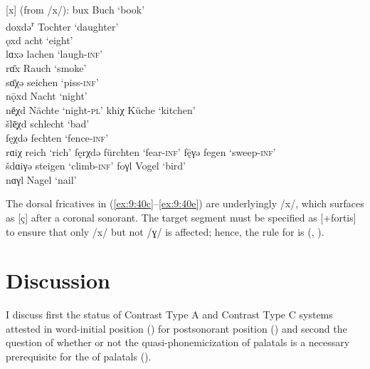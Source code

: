 \ea%
\label{ex:9:40} [x] (from /x/):
\ea\label{ex:9:40a} bux \tab [bux] \tab Buch \tab ‘book’ \\
    doxdə\textsuperscript{r} \tab [doxtər] \tab Tochter \tab ‘daughter’ \\
    ǫxd \tab [ɔxt] \tab acht \tab ‘eight’ \\
    lɑxə \tab [lɑxə] \tab lachen \tab ‘laugh-\textsc{inf}’ \\
    rɑ̄x \tab [rɑːx] \tab Rauch \tab ‘smoke’ \\
\ex\label{ex:9:40b} sɑ̄χə \tab [sɑːçə] \tab seichen \tab ‘piss-\textsc{inf}’ \\
\ex\label{ex:9:40c} nǭxd \tab [nɔːxt] \tab Nacht \tab ‘night’ \\
    nē̜χd \tab [nɛːçt] \tab Nächte \tab ‘night-\textsc{pl}’ 
\ex\label{ex:9:40d} khiχ \tab [kʰiç] \tab Küche \tab ‘kitchen’ \\
    šlē̜χd \tab [ʃlɛːçt] \tab schlecht \tab ‘bad’ \\
    fęχdə \tab [fɛçtə] \tab fechten \tab ‘fence-\textsc{inf}’ \\
    rɑiχ \tab [rɑiç] \tab reich \tab ‘rich’ 
\ex\label{ex:9:40e} fęrχdə \tab [fɛrçtə] \tab fürchten \tab ‘fear-\textsc{inf}’ 
\ex\label{ex:9:40f} fę̄γə \tab [fɛːɣə] \tab fegen \tab ‘sweep-\textsc{inf}’ \\
    šdɑiγə \tab [ʃtɑiɣə] \tab steigen \tab ‘climb-\textsc{inf}’ 
\ex\label{ex:9:40g} foγl \tab [foɣl̩] \tab Vogel \tab ‘bird’ \\
    nɑγl \tab [nɑɣl̩] \tab Nagel \tab ‘nail’ 
    \z
\z 

The dorsal fricatives in (\ref{ex:9:40c}--\ref{ex:9:40e}) are underlyingly /x/, which surfaces as [ç] after a coronal sonorant. The target segment must be specified as [+fortis] to ensure that only /x/ but not /ɣ/ is affected; hence, the rule for  is  (, ).

\section{Discussion}\label{sec:9.4}

I discuss first the status of Contrast Type A and Contrast Type C systems attested in word-initial position () for postsonorant position () and second the question of whether or not the quasi-phonemicization of palatals is a necessary prerequisite for the  of palatals ().


